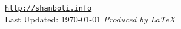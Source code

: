 \vfill
\begin{figure}[h]
\hspace{1.54in}
\end{figure}
\begin{narrow}{0.15in}{1.5in}
\begin{center}
\href{http://shanboli.info}{\tt http://shanboli.info}\\
\vspace{0.15in}
Last Updated: \today
\vspace{0.15in}
\textit{Produced by \LaTeX}
\end{center}
\end{narrow}
